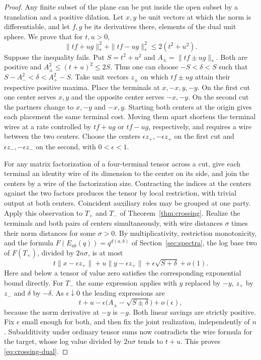 \begin{proof}
Any finite subset of the plane can be put inside the open subset by a
translation and a positive dilation. Let $x,y$ be unit vectors at
which the norm is differentiable, and let $f,g$ be its derivatives
there, elements of the dual unit sphere. We prove that for $t,u>0$,
\begin{equation}\label{eq:crossing-dual}
   \|tf+ug\|_*^2+\|tf-ug\|_*^2\le 2(t^2+u^2).
\end{equation}
Suppose the inequality fails. Put $S=t^2+u^2$ and
$A_\pm=\|tf\pm ug\|_*$. Both are positive and
$A_\pm^2\le(t+u)^2\le 2S$. Thus one can choose $-S<\delta<S$
such that $S-A_-^2<\delta<A_+^2-S$. Take unit vectors $z_\pm$
on which $tf\pm ug$ attain their respective positive maxima.
Place the terminals at $x,-x,y,-y$. On the first cut one center serves
$x,y$ and the opposite center serves $-x,-y$. On the second cut the
partners change to $x,-y$ and $-x,y$. Starting both centers at the
origin gives each placement the same terminal cost. Moving them apart
shortens the terminal wires at a rate controlled by $tf+ug$ or $tf-ug$,
respectively, and requires a wire between the two centers. Choose the
centers $\epsilon z_+,-\epsilon z_+$ on the first cut and
$\epsilon z_-,-\epsilon z_-$ on the second, with $0<\epsilon<1$.

For any matrix factorization of a four-terminal tensor across a cut,
give each terminal an identity wire of its dimension to the center on
its side, and join the centers by a wire of the factorization size.
Contracting the indices at the centers against the two factors
produces the tensor by local restriction, with trivial output at
both centers. Coincident auxiliary roles may be grouped at one party.
Apply this observation to $T_+$ and $T_-$ of
Theorem~\ref{thm:crossing}. Realize the terminals and both pairs of
centers simultaneously, with wire distances $\sigma$ times their
norm distances for some $\sigma>0$. By multiplicativity, restriction
monotonicity, and the formula $F(E_{ab}(q))=q^{d(a,b)}$ of
Section~\ref{sec:spectra}, the log base two of $F(T_+)$, divided by
$2n\sigma$, is at most
\[
 t\|x-\epsilon z_+\|+u\|y-\epsilon z_+\|
                 +\epsilon\sqrt{S+\delta}+o(1).
\]
Here and below a tensor of value zero satisfies the corresponding
exponential bound directly. For $T_-$ the same expression applies
with $y$ replaced by $-y$, $z_+$ by $z_-$ and $\delta$ by $-\delta$.
As $\epsilon\downarrow0$ the leading expressions are
\[
 t+u-\epsilon\big(A_\pm-\sqrt{S\pm\delta}\big)+o(\epsilon),
\]
because the norm derivative at $-y$ is $-g$. Both linear savings
are strictly positive. Fix $\epsilon$ small enough for both, and
then fix the joint realization, independently of $n$. Subadditivity
under ordinary tensor sums now contradicts the wire formula for the
target, whose log value divided by $2n\sigma$ tends to $t+u$.
This proves \eqref{eq:crossing-dual}.


\end{proof}
